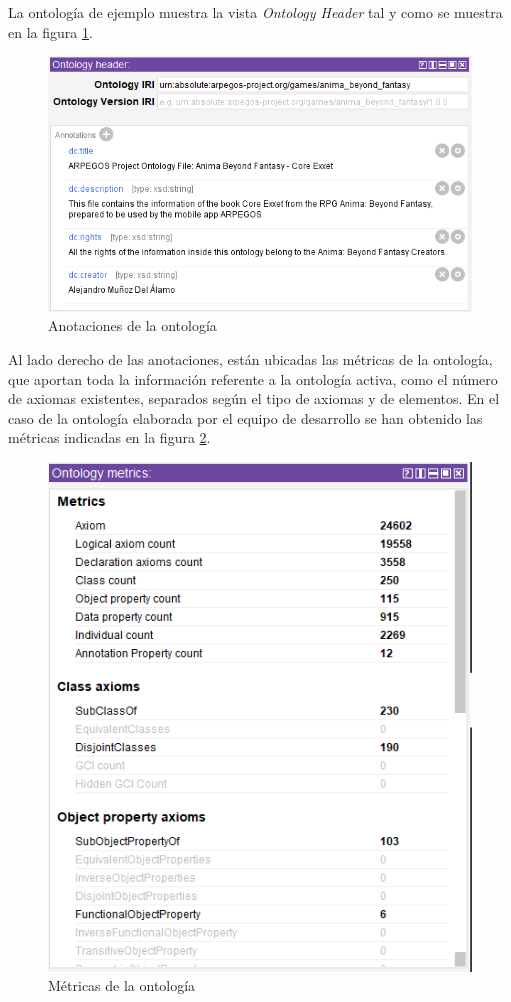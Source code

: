 La ontología de ejemplo muestra la vista \textit{Ontology Header} tal y como se muestra en la 
figura \ref*{Ontology_header}. \medskip

\begin{figure}[H]
    \centering
    \includegraphics[scale=0.6]{Figures/Protege/Ontology_header.png}
    \caption{Anotaciones de la ontología}
    \label{Ontology_header}
\end{figure}

Al lado derecho de las anotaciones, están ubicadas las métricas de la ontología, que aportan toda la información 
referente a la ontología activa, como el número de axiomas existentes, separados según el tipo de axiomas y de elementos.
En el caso de la ontología elaborada por el equipo de desarrollo se han obtenido las métricas indicadas en la figura 
\ref*{Ontology_metrics}.

\begin{figure}[ht]
    \centering
    \includegraphics[scale=0.5]{Figures/Protege/Ontology_metrics.png}
    \caption{Métricas de la ontología}
    \label{Ontology_metrics}
\end{figure}

